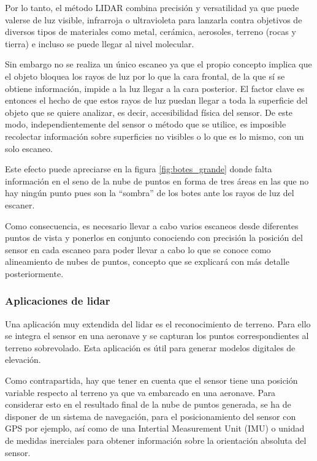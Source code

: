 Por lo tanto, el método LIDAR combina precisión y versatilidad ya que puede valerse de luz visible, infrarroja o ultravioleta para lanzarla contra objetivos de diversos tipos de materiales como metal, cerámica, aerosoles, terreno (rocas y tierra) e incluso se puede llegar al nivel molecular. 
 
Sin embargo no se realiza un único escaneo ya que el propio concepto implica que el objeto bloquea los rayos de luz por lo que la cara frontal, de la que sí se obtiene información, impide a la luz llegar a la cara posterior. El factor clave es entonces el hecho de que estos rayos de luz puedan llegar a toda la superficie del objeto que se quiere analizar, es decir, accesibilidad física del sensor.
De este modo, independientemente del sensor o método que se utilice, es imposible recolectar
información sobre superficies no visibles o lo que es lo mismo, con un solo escaneo.

Este efecto puede apreciarse en la figura \ref{fig:botes_grande} donde falta información en el seno de la nube de puntos en forma de tres áreas en las que no hay ningún punto pues son la ``sombra'' de los botes ante los rayos de luz del escaner.

Como consecuencia, es necesario llevar a cabo varios escaneos desde diferentes puntos de vista y
ponerlos en conjunto conociendo con precisión la posición del sensor en cada escaneo para poder llevar a cabo lo que se conoce como alineamiento de nubes de puntos, concepto que se explicará con más detalle posteriormente.


\subsubsection{Aplicaciones de lidar}

Una aplicación muy extendida del lidar es el reconocimiento de terreno. Para ello se integra el sensor en una aeronave y se capturan los puntos correspondientes al terreno sobrevolado. Esta aplicación es útil para generar modelos digitales de elevación.

Como contrapartida, hay que tener en cuenta que el sensor tiene una posición variable respecto al terreno ya que va embarcado en una aeronave. Para considerar esto en el resultado final de la nube de puntos generada, se ha de disponer de un sistema de navegación, para el posicionamiento del sensor con GPS por ejemplo, así como de una Intertial Measurement Unit (IMU) o unidad de medidas inerciales para obtener información sobre la orientación absoluta del sensor.

